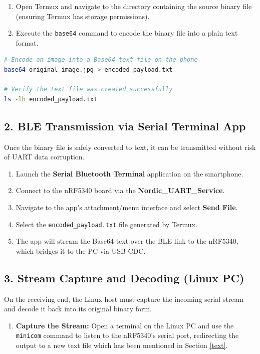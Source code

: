 \documentclass[conference]{IEEEtran}
\begin{document}
\begin{enumerate}
    \item Open Termux and navigate to the directory containing the source binary file (ensuring Termux has storage permissions).
    \item Execute the \texttt{base64} command to encode the binary file into a plain text format.
\end{enumerate}

\begin{lstlisting}[language=bash]
# Encode an image into a Base64 text file on the phone
base64 original_image.jpg > encoded_payload.txt

# Verify the text file was created successfully
ls -lh encoded_payload.txt
\end{lstlisting}

\subsection{2. BLE Transmission via Serial Terminal App}
Once the binary file is safely converted to text, it can be transmitted without risk of UART data corruption.

\begin{enumerate}
    \item Launch the \textbf{Serial Bluetooth Terminal} application on the smartphone.
    \item Connect to the nRF5340 board via the \textbf{Nordic\_UART\_Service}.
    \item Navigate to the app's attachment/menu interface and select \textbf{Send File}.
    \item Select the \texttt{encoded\_payload.txt} file generated by Termux.
    \item The app will stream the Base64 text over the BLE link to the nRF5340, which bridges it to the PC via USB-CDC.
\end{enumerate}

\subsection{3. Stream Capture and Decoding (Linux PC)}
On the receiving end, the Linux host must capture the incoming serial stream and decode it back into its original binary form.

\begin{enumerate}
    \item \textbf{Capture the Stream:} Open a terminal on the Linux PC and use the \texttt{minicom} command to listen to the nRF5340's serial port, redirecting the output to a new text file which has been mentioned in Section \ref{text}.
\end{enumerate}
\end{document}
